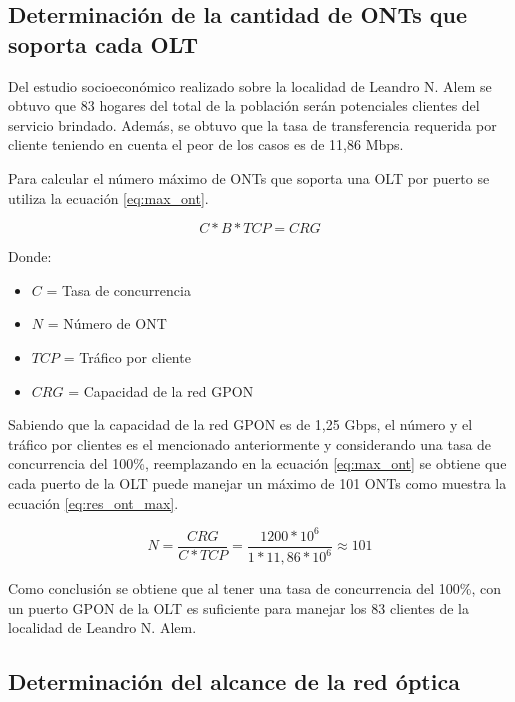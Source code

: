 \documentclass[11pt,a4paper]{article}
\begin{document}
\subsection{Determinación de la cantidad de ONTs que soporta cada OLT}

Del estudio socioeconómico realizado sobre la localidad de Leandro N. Alem se obtuvo que 83 hogares del total de la población serán potenciales clientes del servicio brindado. 
Además, se obtuvo que la tasa de transferencia requerida por cliente teniendo en cuenta el peor de los casos es de 11,86 Mbps.

Para calcular el número máximo de ONTs que soporta una OLT por puerto se utiliza la ecuación \ref{eq:max_ont}.

\begin{equation}
 C*B*TCP=CRG
 \label{eq:max_ont}
\end{equation}


Donde:

\begin{itemize}
\item  $C$ = Tasa de concurrencia
\item  $N$ = Número de ONT
\item  $TCP$ = Tráfico por cliente
\item  $CRG$ = Capacidad de la red GPON
\end{itemize}

Sabiendo que la capacidad de la red GPON es de 1,25 Gbps, el número y el tráfico por clientes es el mencionado anteriormente y considerando una tasa de concurrencia del 100\%, reemplazando en la ecuación \ref{eq:max_ont} se obtiene que cada puerto de la OLT puede manejar un máximo de 101 ONTs como muestra la ecuación \ref{eq:res_ont_max}.

\begin{equation}
  N=\frac{CRG}{C*TCP}=\frac{1200*10^6}{1*11,86*10^6}\approx 101  
  \label{eq:res_ont_max}
\end{equation}

Como conclusión se obtiene que al tener una tasa de concurrencia del 100\%, con un puerto GPON de la OLT es suficiente para manejar los 83 clientes de la localidad de Leandro N. Alem.



\subsection{Determinación del alcance de la red óptica}
\end{document}
